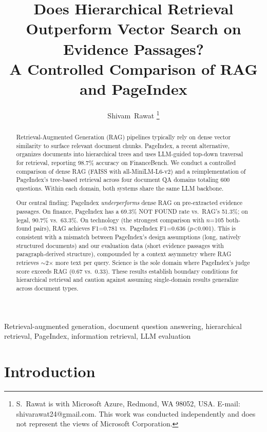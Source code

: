 \documentclass[journal]{IEEEtran}
\begin{document}
\title{Does Hierarchical Retrieval Outperform Vector Search on Evidence Passages?\\ A Controlled Comparison of RAG and PageIndex}

\author{Shivam~Rawat
\thanks{S.\ Rawat is with Microsoft Azure, Redmond, WA 98052, USA. E-mail: shivarawat24@gmail.com. This work was conducted independently and does not represent the views of Microsoft Corporation.}
}

\maketitle

\begin{abstract}
Retrieval-Augmented Generation (RAG) pipelines typically rely on dense vector similarity to surface relevant document chunks. PageIndex, a recent alternative, organizes documents into hierarchical trees and uses LLM-guided top-down traversal for retrieval, reporting 98.7\% accuracy on FinanceBench. We conduct a controlled comparison of dense RAG (FAISS with all-MiniLM-L6-v2) and a reimplementation of PageIndex's tree-based retrieval across four document QA domains totaling 600 questions. Within each domain, both systems share the same LLM backbone.

Our central finding: PageIndex \emph{underperforms} dense RAG on pre-extracted evidence passages. On finance, PageIndex has a 69.3\% NOT FOUND rate vs.\ RAG's 51.3\%; on legal, 90.7\% vs.\ 63.3\%. On technology (the strongest comparison with $n$=105 both-found pairs), RAG achieves F1=0.781 vs.\ PageIndex F1=0.636 ($p$<0.001). This is consistent with a mismatch between PageIndex's design assumptions (long, natively structured documents) and our evaluation data (short evidence passages with paragraph-derived structure), compounded by a context asymmetry where RAG retrieves $\sim$2$\times$ more text per query. Science is the sole domain where PageIndex's judge score exceeds RAG (0.67 vs.\ 0.33). These results establish boundary conditions for hierarchical retrieval and caution against assuming single-domain results generalize across document types.
\end{abstract}

\begin{IEEEkeywords}
Retrieval-augmented generation, document question answering, hierarchical retrieval, PageIndex, information retrieval, LLM evaluation
\end{IEEEkeywords}

\section{Introduction}
\label{sec:intro}
\end{document}
